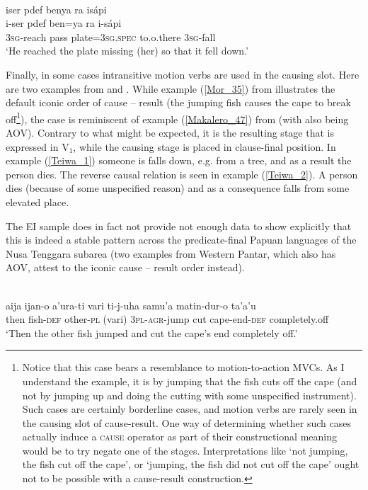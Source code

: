 \ea \label{Biak_43}
\\
\glll iser pdef benya ra isápi \\
i-ser pdef ben=ya ra i-sápi \\
3\textsc{sg}-reach pass plate=3\textsc{sg}.\textsc{spec} to.o.there 3\textsc{sg}-fall \\
\glft `He reached the plate missing (her) so that it fell down.' \\
\z

Finally, in some cases intransitive motion verbs are used in the causing slot. Here are two examples from  and . While example (\ref{Mor_35}) from  illustrates the default iconic order of cause -- result (the jumping fish causes the cape to break off\footnote{Notice that this case bears a resemblance to motion-to-action MVCs. As I understand the  example, it is by jumping that the fish cuts off the cape (and not by jumping up and doing the cutting with some unspecified instrument). Such cases are certainly borderline cases, and motion verbs are rarely seen in the causing slot of cause-result. One way of determining whether such cases actually induce a \textsc{cause} operator as part of their constructional meaning would be to try negate one of the stages. Interpretations like `not jumping, the fish cut off the cape', or `jumping, the fish did not cut off the cape' ought not to be possible with a cause-result construction.}), the  case is reminiscent of example (\ref{Makalero_47}) from  (with  also being AOV). Contrary to what might be expected, it is the resulting stage that is expressed in V$_1$, while the causing stage is placed in clause-final position. In example (\ref{Teiwa_1}) someone is falls down, e.g. from a tree, and as a result the person dies. The reverse causal relation is seen in example (\ref{Teiwa_2}). A person dies (because of some unspecified reason) and as a consequence falls from some elevated place. 

The EI sample does in fact not provide not enough data to show explicitly that this is indeed a stable pattern across the predicate-final Papuan languages of the Nusa Tenggara subarea (two examples from Western Pantar, which also has AOV, attest to the iconic cause -- result order instead).

\ea \label{Mor_35}
\\
\gll aija ijan-o a'ura-ti vari ti-j-uha samu'a matin-dur-o ta'a'u \\
then fish-\textsc{def} other-\textsc{pl} (vari) 3\textsc{pl}-\textsc{agr}-jump cut cape-end-\textsc{def} completely.off \\
\glft `Then the other fish jumped and cut the cape's end completely off.'\\ 
\z

